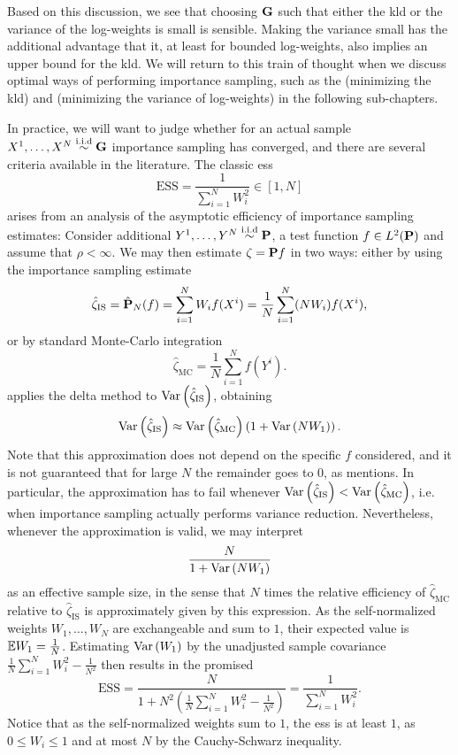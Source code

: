 Based on this discussion, we see that choosing $\G$ such that either the \acrshort{kld} or the variance of the log-weights is small is sensible. Making the variance small has the additional advantage that it, at least for bounded log-weights, also implies an upper bound for the \acrshort{kld}. We will return to this train of thought when we discuss optimal ways of performing importance sampling, such as the \acem (minimizing the \acrshort{kld}) and \aeis (minimizing the variance of log-weights) in the following sub-chapters.

In practice, we will want to judge whether for an actual sample $X^{1}, \dots, X^{N} \iid \G$ importance sampling has converged, and there are several criteria available in the literature. The classic \gls{ess}\citep{Kong1994Sequential} 
$$
\text{ESS} = \frac{1}{\sum_{i = 1}^N W^{2}_{i}} \in \left[1, N\right]
$$
arises from an analysis of the asymptotic efficiency of importance sampling estimates: Consider additional $Y^{1}, \dots, Y^{N}\iid \P$, a test function $f \in L^{2} (\P)$ and assume that $\rho < \infty$. We may then estimate $\zeta = \P f$ in two ways: either by using the importance sampling estimate 
$$
\hat \zeta_{\text{IS}} = \hat \P_{N} (f) = \sum_{i = 1}^N W_{i} f(X^{i}) = \frac{1}{N} \sum_{i = 1}^N (NW_{i}) f(X^{i}),
$$
or by standard Monte-Carlo integration 
$$
\hat \zeta_{\text{MC}} = \frac{1}{N}\sum_{i = 1}^N f(Y^{i}).
$$
\citep{Kong1992Note} applies the delta method to $\var \left( \hat\zeta_{\text{IS}} \right)$, obtaining
\begin{align*}
    \var \left( \hat\zeta_{\text{IS}}  \right) \approx \var \left( \hat \zeta_{\text{MC}} \right)\left( 1 + \var \left( NW_{1}\right) \right).
\end{align*}
Note that this approximation does not depend on the specific $f$ considered, and it is not guaranteed that for large $N$ the remainder goes to $0$, as \citep{Kong1992Note} mentions. In particular, the approximation has to fail whenever $\var \left( \hat\zeta_{\text{IS}} \right) < \var \left( \hat \zeta_{\text{MC}} \right)$, i.e. when importance sampling actually performs variance reduction. Nevertheless, whenever the approximation is valid, we may interpret 
$$
\frac{N}{1 + \var \left( NW_{1} \right)}
$$
as an effective sample size, in the sense that $N$ times the relative efficiency of $\hat\zeta_{\text{MC}}$ relative to $\hat \zeta_{\text{IS}}$ is approximately given by this expression. As the self-normalized weights $W_{1}, \dots, W_{N}$ are exchangeable and sum to $1$, their expected value is $ \E W_{1} = \frac{1}N$. Estimating $\var \left( W_{1} \right)$ by the unadjusted sample covariance $\frac{1}{N} \sum_{i=1}^N W_{i}^2 - \frac{1}{N^{2}}$ then results in the promised
$$
\text{ESS} = \frac{N}{1 + N^{2}\left(\frac{1}{N} \sum_{i = 1}^N W_{i}^2 - \frac{1}{N^{2}}\right)} = \frac{1}{\sum_{i = 1}^{N} W_{i}^{2}}.
$$
Notice that as the self-normalized weights sum to $1$, the \acrshort{ess} is at least $1$, as $0 \leq W_{i} \leq 1$ and at most $N$ by the Cauchy-Schwarz inequality. 

